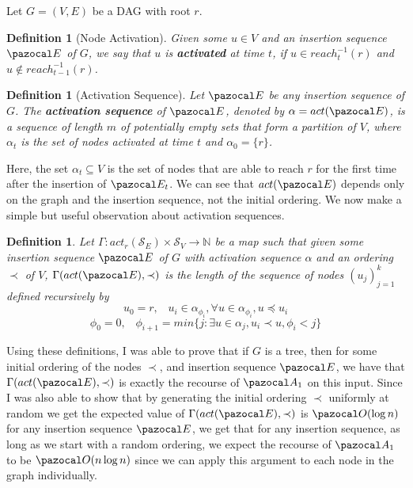 \documentclass{article}
\newtheorem{definition}[theorem]{Definition}
\begin{document}
Let $G=(V,E)$ be a DAG with root $r$.

\begin{definition}[Node Activation]
Given some $u \in V$ and an insertion sequence $\pazocal E$ of $G$, we say that $u$ is \textbf{activated} at time $t$, if $u \in reach^{-1}_t(r)$ and $u \notin reach^{-1}_{t-1}(r)$.
\end{definition}

\begin{definition}[Activation Sequence]
Let $\pazocal E$ be any insertion sequence of $G$. The \textbf{activation sequence} of $\pazocal E$, denoted by $\alpha = act(\pazocal E)$, is a sequence of length $m$ of potentially empty sets that form a partition of $V$, where $\alpha_t$ is the set of nodes activated at time $t$ and $\alpha_0 = \{r\}$.
\end{definition}

Here, the set $\alpha_t \subseteq V$ is the set of nodes that are able to reach $r$ for the first time after the insertion of $\pazocal E_t$. We can see that $act(\pazocal E)$ depends only on the graph and the insertion sequence, not the initial ordering. We now make a simple but useful observation about activation sequences.

\begin{definition}\label{gammafunction}
Let $\Gamma : act_r(\mathcal{S}_{E}) \times \mathcal S_V \longrightarrow \mathbb{N}$ be a map such that given some insertion sequence $\pazocal E$ of $G$ with activation sequence $\alpha$ and an ordering $\prec$ of $V$, $\Gamma(act(\pazocal E), \prec)$ is the length of the sequence of nodes $(u_j)_{j=1}^k$ defined recursively by
\[ u_0 = r, \;\;\; u_i \in \alpha_{\phi_i},\forall u \in \alpha_{\phi_i}, u \preceq u_i \]
\[ \phi_0 = 0, \;\;\; \phi_{i+1} = min\{j : \exists u \in \alpha_j, u_i \prec u, \phi_i < j\}\]
\end{definition}

Using these definitions, I was able to prove that if $G$ is a tree, then for some initial ordering of the nodes $\prec$, and insertion sequence $\pazocal E$, we have that $\Gamma(act(\pazocal E), \prec)$ is exactly the recourse of $\pazocal A_1$ on this input. Since I was also able to show that by generating the initial ordering $\prec$ uniformly at random we get the expected value of $\Gamma(act(\pazocal E), \prec)$ is $\pazocal O(\log n)$ for any insertion sequence $\pazocal E$, we get that for any insertion sequence, as long as we start with a random ordering, we expect the recourse of $\pazocal A_1$ to be $\pazocal O(n \log n)$ since we can apply this argument to each node in the graph individually.
\end{document}
